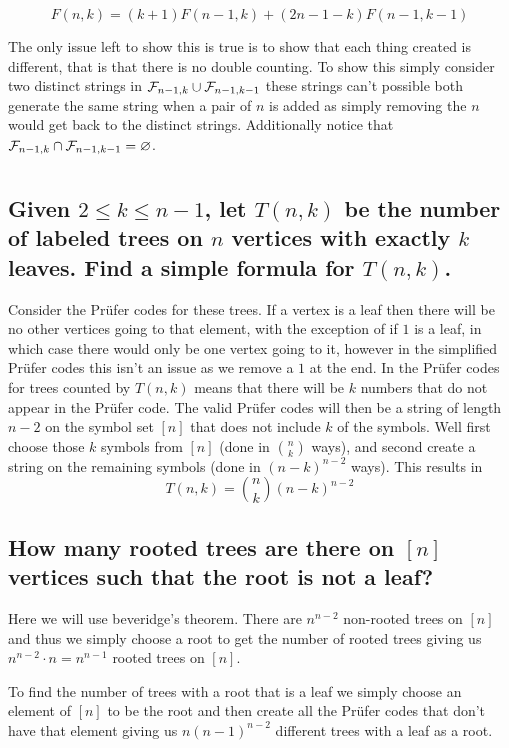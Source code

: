 \documentclass{article}
\theoremstyle{definition}
\begin{document}
	$$F(n,k) = (k+1)F(n-1,k)+(2n-1-k)F(n-1,k-1)$$
	
	The only issue left to show this is true is to show that each thing created is different, that is that there is no double counting. To show this simply consider two distinct strings in $\mathcal F_{n-1,k} \cup \mathcal F_{n-1,k-1}$ these strings can't possible both generate the same string when a pair of $n$ is added as simply removing the $n$ would get back to the distinct strings. Additionally notice that $\mathcal F_{n-1,k} \cap \mathcal F_{n-1,k-1} = \varnothing$.
	
	\section{}
	
	\subsection{Given $2\le k \le n-1$, let $T(n,k)$ be the number of labeled trees on $n$ vertices with exactly $k$ leaves. Find a simple formula for $T(n,k)$.}
	
	Consider the Pr\"ufer codes for these trees. If a vertex is a leaf then there will be no other vertices going to that element, with the exception of if $1$ is a leaf, in which case there would only be one vertex going to it, however in the simplified Pr\"ufer codes this isn't an issue as we remove a $1$ at the end. In the Pr\"ufer codes for trees counted by $T(n,k)$ means that there will be $k$ numbers that do not appear in the Pr\"ufer code. The valid Pr\"ufer codes will then be a string of length $n-2$ on the symbol set $[n]$ that does not include $k$ of the symbols. Well first choose those $k$ symbols from $[n]$ (done in $\binom nk$ ways), and second create a string on the remaining symbols (done in $(n-k)^{n-2}$ ways). This results in $$T(n,k) = \binom nk(n-k)^{n-2}$$
	
	\subsection{How many rooted trees are there on $[n]$ vertices such that the root is \textbf{not} a leaf?}
	
	Here we will use beveridge's theorem. There are $n^{n-2}$ non-rooted trees on $[n]$ and thus we simply choose a root to get the number of rooted trees giving us $n^{n-2}\cdot n = n^{n-1}$ rooted trees on $[n]$.
	
	To find the number of trees with a root that is a leaf we simply choose an element of $[n]$ to be the root and then create all the Pr\"ufer codes that don't have that element giving us $n(n-1)^{n-2}$ different trees with a leaf as a root.
	
\end{document}
